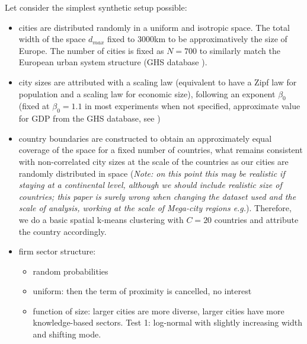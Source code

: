 \documentclass{article}
\begin{document}
Let consider the simplest synthetic setup possible:
\begin{itemize}
    \item cities are distributed randomly in a uniform and isotropic space. The total width of the space $d_{max}$ fixed to 3000km to be approximatively the size of Europe. The number of cities is fixed as $N=700$ to similarly match the European urban system structure (GHS database \citep{Florczyk2019ghs}).
    \item city sizes are attributed with a scaling law (equivalent to have a Zipf law for population and a scaling law for economic size), following an exponent $\beta_0$ (fixed at $\beta_0 = 1.1$ in most experiments when not specified, approximate value for GDP from the GHS database, see \citep{raimbault:halshs-02284897})
    \item country boundaries are constructed to obtain an approximately equal coverage of the space for a fixed number of countries, what remains consistent with non-correlated city sizes at the scale of the countries as our cities are randomly distributed in space \citep{simini2019testing} (\textit{Note: on this point this may be realistic if staying at a continental level, although we should include realistic size of countries; this paper is surely wrong when changing the dataset used and the scale of analysis, working at the scale of Mega-city regions e.g.}). Therefore, we do a basic spatial k-means clustering with $C = 20$ countries and attribute the country accordingly.
    \item firm sector structure: 
    \begin{itemize}
        \item random probabilities
        \item uniform: then the term of proximity is cancelled, no interest
        \item function of size: larger cities are more diverse, larger cities have more knowledge-based sectors. Test 1: log-normal with slightly increasing width and shifting mode.
    \end{itemize}
\end{itemize}
\end{document}

